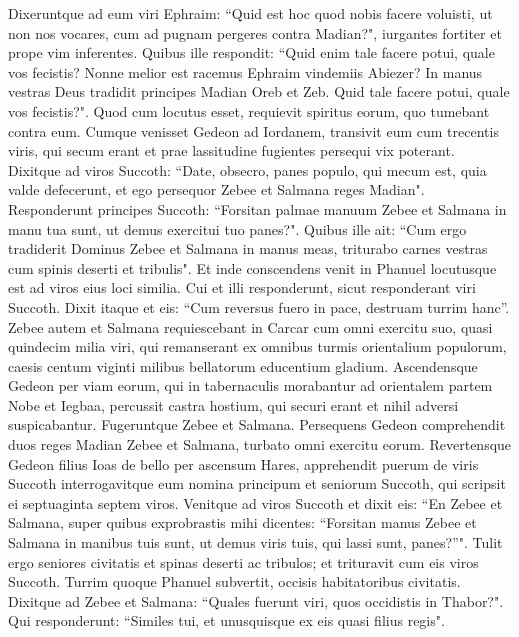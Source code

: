 \begin{biblechapter}  
\verse Dixeruntque ad eum viri Ephraim: “Quid est hoc quod nobis facere voluisti, ut non nos vocares, cum ad pugnam pergeres contra Madian?", iurgantes fortiter et prope vim inferentes. 
\verse Quibus ille respondit: “Quid enim tale facere potui, quale vos fecistis? Nonne melior est racemus Ephraim vindemiis Abiezer? 
\verse In manus vestras Deus tradidit principes Madian Oreb et Zeb. Quid tale facere potui, quale vos fecistis?". Quod cum locutus esset, requievit spiritus eorum, quo tumebant contra eum. 
\verse Cumque venisset Gedeon ad Iordanem, transivit eum cum trecentis viris, qui secum erant et prae lassitudine fugientes persequi vix poterant. 
\verse Dixitque ad viros Succoth: “Date, obsecro, panes populo, qui mecum est, quia valde defecerunt, et ego persequor Zebee et Salmana reges Madian". 
\verse Responderunt principes Succoth: “Forsitan palmae manuum Zebee et Salmana in manu tua sunt, ut demus exercitui tuo panes?". 
\verse Quibus ille ait: “Cum ergo tradiderit Dominus Zebee et Salmana in manus meas, triturabo carnes vestras cum spinis deserti et tribulis". 
\verse Et inde conscendens venit in Phanuel locutusque est ad viros eius loci similia. Cui et illi responderunt, sicut responderant viri Succoth. 
\verse Dixit itaque et eis: “Cum reversus fuero in pace, destruam turrim hanc”. 
\verse Zebee autem et Salmana requiescebant in Carcar cum omni exercitu suo, quasi quindecim milia viri, qui remanserant ex omnibus turmis orientalium populorum, caesis centum viginti milibus bellatorum educentium gladium. 
\verse Ascendensque Gedeon per viam eorum, qui in tabernaculis morabantur ad orientalem partem Nobe et Iegbaa, percussit castra hostium, qui securi erant et nihil adversi suspicabantur. 
\verse Fugeruntque Zebee et Salmana. Persequens Gedeon comprehendit duos reges Madian Zebee et Salmana, turbato omni exercitu eorum. 
\verse Revertensque Gedeon filius Ioas de bello per ascensum Hares, 
\verse apprehendit puerum de viris Succoth interrogavitque eum nomina principum et seniorum Succoth, qui scripsit ei septuaginta septem viros. 
\verse Venitque ad viros Succoth et dixit eis: “En Zebee et Salmana, super quibus exprobrastis mihi dicentes: “Forsitan manus Zebee et Salmana in manibus tuis sunt, ut demus viris tuis, qui lassi sunt, panes?”". 
\verse Tulit ergo seniores civitatis et spinas deserti ac tribulos; et trituravit cum eis viros Succoth. 
\verse Turrim quoque Phanuel subvertit, occisis habitatoribus civitatis. 
\verse Dixitque ad Zebee et Salmana: “Quales fuerunt viri, quos occidistis in Thabor?". Qui responderunt: “Similes tui, et unusquisque ex eis quasi filius regis". 

\end{biblechapter}
